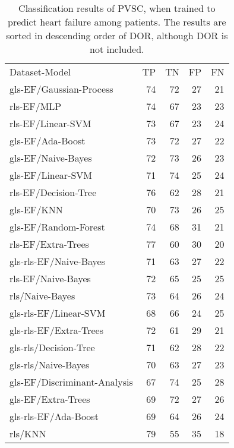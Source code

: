 \begin{longtable}{lrrrr}
    \caption{Classification results of PVSC, when trained to predict heart failure among patients.
             The results are sorted in descending order of DOR, although DOR is not included.}
    \label{tab:pvsc_hf_raw_results}\\
    \hline
    Dataset-Model                    &  TP &  TN &  FP &  FN \\
    gls-EF/Gaussian-Process          &  74 &  72 &  27 &  21 \\
    rls-EF/MLP                       &  74 &  67 &  23 &  23 \\
    rls-EF/Linear-SVM                &  73 &  67 &  23 &  24 \\
    gls-EF/Ada-Boost                 &  73 &  72 &  27 &  22 \\
    gls-EF/Naive-Bayes               &  72 &  73 &  26 &  23 \\
    gls-EF/Linear-SVM                &  71 &  74 &  25 &  24 \\
    rls-EF/Decision-Tree             &  76 &  62 &  28 &  21 \\
    gls-EF/KNN                       &  70 &  73 &  26 &  25 \\
    gls-EF/Random-Forest             &  74 &  68 &  31 &  21 \\
    rls-EF/Extra-Trees               &  77 &  60 &  30 &  20 \\
    gls-rls-EF/Naive-Bayes           &  71 &  63 &  27 &  22 \\
    rls-EF/Naive-Bayes               &  72 &  65 &  25 &  25 \\
    rls/Naive-Bayes                  &  73 &  64 &  26 &  24 \\
    gls-rls-EF/Linear-SVM            &  68 &  66 &  24 &  25 \\
    gls-rls-EF/Extra-Trees           &  72 &  61 &  29 &  21 \\
    gls-rls/Decision-Tree            &  71 &  62 &  28 &  22 \\
    gls-rls/Naive-Bayes              &  70 &  63 &  27 &  23 \\
    gls-EF/Discriminant-Analysis     &  67 &  74 &  25 &  28 \\
    gls-EF/Extra-Trees               &  69 &  72 &  27 &  26 \\
    gls-rls-EF/Ada-Boost             &  69 &  64 &  26 &  24 \\
    rls/KNN                          &  79 &  55 &  35 &  18 \\

\end{longtable}
